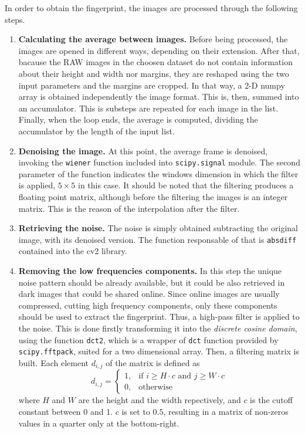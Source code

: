 In order to obtain the fingerprint, the images are processed through the following steps.
\begin{enumerate}
\item{\textbf{Calculating the average between images.}}
        Before being processed, the images are opened in different ways, depending on their extension. After that, bacause the RAW images in the choosen dataset do not contain information about their height and width nor margins, they are reshaped using the two input parameters and the margins are cropped. In that way, a 2-D numpy array is obtained independently the image format. This is, then, summed into an accumulator. This is substeps are repeated for each image in the list. Finally, when the loop ends, the average is computed, dividing the accumulator by the length of the input list.
\item{\textbf{Denoising the image.}}
        At this point, the average frame is denoised, invoking the \texttt{wiener} function included into \texttt{scipy.signal} module. The second parameter of the function indicates the windows dimension in which the filter is applied, $5\times5$ in this case. It should be noted that the filtering produces a floating point matrix, although before the filtering the images is an integer matrix. This is the reason of the interpolation after the filter.
\item{\textbf{Retrieving the noise.}}
        The noise is simply obtained subtracting the original image, with its denoised version. The function responsable of that is \texttt{absdiff} contained into the cv2 library.
\item{\textbf{Removing the low frequencies components.}}
        In this step the unique noise pattern should be already available, but it could be also retrieved in dark images that could be shared online. Since online images are usually compressed, cutting high frequency components, only these components should be used to extract the fingerprint. Thus, a high-pass filter is applied to the noise. This is done firstly transforming it into the \emph{discrete cosine domain}, using the function \texttt{dct2}, which is a wrapper of \texttt{dct} function provided by \texttt{scipy.fftpack}, suited for a two dimensional array. Then, a filtering matrix is built. Each element $d_{i,j}$ of the matrix is defined as
        \begin{equation}
          d_{i,j} = \begin{cases} 1, & \mbox{if } i \geq H \cdot c \mbox{ and } j \geq W \cdot c\\ 0, & \mbox{otherwise} \end{cases}
        \end{equation}
        where $H$ and  $W$ are the height and the width repectively, and $c$ is the cutoff constant between 0 and 1.
        $c$ is set to $0.5$, resulting in a matrix of non-zeros values in a quarter only at the bottom-right.


\end{enumerate}
